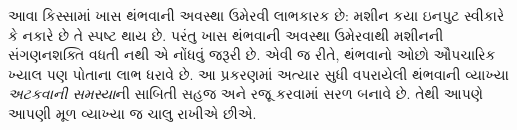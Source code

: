 \documentclass[../../../include/open-logic-section]{subfiles}
\begin{document}
\begin{explain}
આવા કિસ્સામાં ખાસ થંભવાની અવસ્થા ઉમેરવી લાભકારક છે:
મશીન કયા ઇનપુટ સ્વીકારે કે નકારે છે તે સ્પષ્ટ થાય છે.
પરંતુ ખાસ થંભવાની અવસ્થા ઉમેરવાથી મશીનની સંગણનશક્તિ
વધતી નથી એ નોંધવું જરૂરી છે. એવી જ રીતે, થંભવાનો
ઓછો ઔપચારિક ખ્યાલ પણ પોતાના લાભ ધરાવે છે. આ
પ્રકરણમાં અત્યાર સુધી વપરાયેલી થંભવાની વ્યાખ્યા
\emph{અટકવાની સમસ્યા}ની સાબિતી સહજ અને રજૂ કરવામાં
સરળ બનાવે છે. તેથી આપણે આપણી મૂળ વ્યાખ્યા જ
ચાલુ રાખીએ છીએ.
\end{explain}
\end{document}
